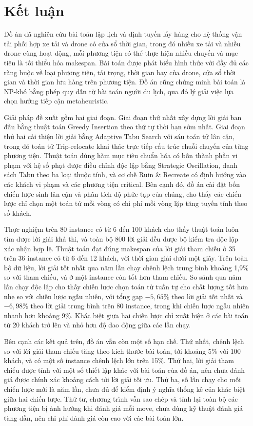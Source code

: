 \documentclass[../DoAn.tex]{subfiles}
\begin{document}
\section{Kết luận}

Đồ án đã nghiên cứu bài toán lập lịch và định tuyến lấy hàng cho hệ thống vận tải phối hợp xe tải và drone có cửa sổ thời gian, trong đó nhiều xe tải và nhiều drone cùng hoạt động, mỗi phương tiện có thể thực hiện nhiều chuyến và mục tiêu là tối thiểu hóa makespan. Bài toán được phát biểu hình thức với đầy đủ các ràng buộc về loại phương tiện, tải trọng, thời gian bay của drone, cửa sổ thời gian và thời gian lưu hàng trên phương tiện. Đồ án cũng chứng minh bài toán là NP-khó bằng phép quy dẫn từ bài toán người du lịch, qua đó lý giải việc lựa chọn hướng tiếp cận metaheuristic.

Giải pháp đề xuất gồm hai giai đoạn. Giai đoạn thứ nhất xây dựng lời giải ban đầu bằng thuật toán Greedy Insertion theo thứ tự thời hạn sớm nhất. Giai đoạn thứ hai cải thiện lời giải bằng Adaptive Tabu Search với sáu toán tử lân cận, trong đó toán tử Trip-relocate khai thác trực tiếp cấu trúc chuỗi chuyến của từng phương tiện. Thuật toán dùng hàm mục tiêu chuẩn hóa có bốn thành phần vi phạm với hệ số phạt được điều chỉnh độc lập bằng Strategic Oscillation, danh sách Tabu theo ba loại thuộc tính, và cơ chế Ruin \& Recreate có định hướng vào các khách vi phạm và các phương tiện critical. Bên cạnh đó, đồ án cài đặt bốn chiến lược sinh lân cận và phân tích độ phức tạp của chúng, cho thấy các chiến lược chỉ chọn một toán tử mỗi vòng có chi phí mỗi vòng lặp tăng tuyến tính theo số khách.

Thực nghiệm trên 80 instance có từ 6 đến 100 khách cho thấy thuật toán luôn tìm được lời giải khả thi, và toàn bộ 800 lời giải đều được bộ kiểm tra độc lập xác nhận hợp lệ. Thuật toán đạt đúng makespan của lời giải tham chiếu ở 35 trên 36 instance có từ 6 đến 12 khách, với thời gian giải dưới một giây. Trên toàn bộ dữ liệu, lời giải tốt nhất qua năm lần chạy chênh lệch trung bình khoảng 1,9\% so với tham chiếu, và ở một instance còn tốt hơn tham chiếu. So sánh qua năm lần chạy độc lập cho thấy chiến lược chọn toán tử tuần tự cho chất lượng tốt hơn nhẹ so với chiến lược ngẫu nhiên, với tổng gap $-5{,}65\%$ theo lời giải tốt nhất và $-6{,}98\%$ theo lời giải trung bình trên 80 instance, trong khi chiến lược ngẫu nhiên nhanh hơn khoảng 9\%. Khác biệt giữa hai chiến lược chỉ xuất hiện ở các bài toán từ 20 khách trở lên và nhỏ hơn độ dao động giữa các lần chạy.

Bên cạnh các kết quả trên, đồ án vẫn còn một số hạn chế. Thứ nhất, chênh lệch so với lời giải tham chiếu tăng theo kích thước bài toán, tới khoảng 5\% với 100 khách, và có một số instance chênh lệch lớn trên 15\%. Thứ hai, lời giải tham chiếu được tính với một số thiết lập khác với bài toán của đồ án, nên chưa đánh giá được chính xác khoảng cách tới lời giải tối ưu. Thứ ba, số lần chạy cho mỗi chiến lược mới là năm lần, chưa đủ để kiểm định ý nghĩa thống kê của khác biệt giữa hai chiến lược. Thứ tư, chương trình vẫn sao chép và tính lại toàn bộ các phương tiện bị ảnh hưởng khi đánh giá mỗi move, chưa dùng kỹ thuật đánh giá tăng dần, nên chi phí đánh giá còn cao với các bài toán lớn.
\end{document}

